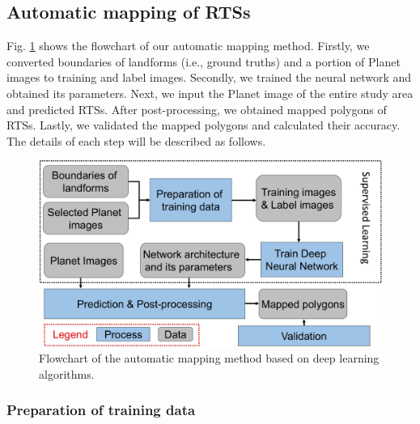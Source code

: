 \documentclass[preprint,12pt,authoryear]{elsarticle}
\begin{document}
\subsection{Automatic mapping of RTSs}
\label{subsec_auto_mapping}

Fig. \ref{fig_flowchart} shows the flowchart of our automatic mapping method. Firstly, we converted boundaries of landforms (i.e., ground truths) and a portion of Planet images to training and label images. Secondly, we trained the neural network and obtained its parameters. Next, we input the Planet image of the entire study area and predicted RTSs. After post-processing, we obtained mapped polygons of RTSs. Lastly, we validated the mapped polygons and calculated their accuracy. The details of each step will be described as follows. 

\begin{figure}[ht]
	\centering
	\includegraphics[width=12cm]{figures/flowchart_trim.jpg}
	\caption{Flowchart of the automatic mapping method based on deep learning algorithms.}
	\label{fig_flowchart}
\end{figure}

\subsubsection{Preparation of training data}
\label{subsubsec_pre_trainingdata}
\end{document}
